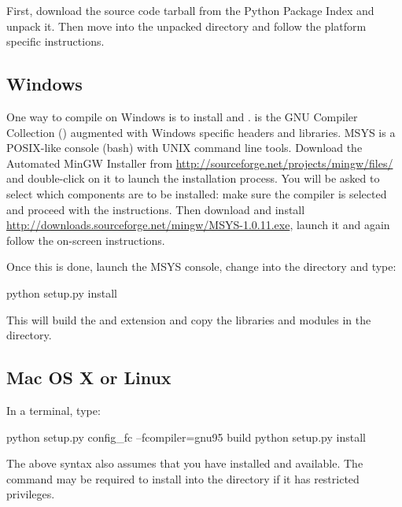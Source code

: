 \documentclass[]{jss}
\begin{document}
First, download the source code tarball from the Python Package Index and unpack it. Then move
into the unpacked directory and follow the platform specific instructions.



\subsection{Windows}
  \label{windows}%


One way to compile  on Windows is to install  \citep{mingw} and .  is
the GNU Compiler Collection () augmented with Windows specific headers and
libraries. MSYS is a POSIX-like console (bash) with UNIX command line tools.
Download the Automated MinGW Installer from \href{http://sourceforge.net/projects/mingw/files/}{http://sourceforge.net/projects/mingw/files/} and double-click on it to launch
the installation process. You will be asked to select which
components are to be installed: make sure the  \citep{gcc} compiler is selected and
proceed with the instructions. Then download and install \href{http://downloads.sourceforge.net/mingw/MSYS-1.0.11.exe}{http://downloads.sourceforge.net/mingw/MSYS-1.0.11.exe},
launch it and again follow the on-screen instructions.

Once this is done, launch the MSYS console, change into the  directory and
type:
\begin{CodeInput}
python setup.py install
\end{CodeInput}

This will build the  and  extension and copy the libraries and  
modules in the  directory.



\subsection{Mac OS X or Linux}
  \label{mac-os-x-or-linux}%


In a terminal, type:
\begin{CodeInput}
python setup.py config_fc --fcompiler=gnu95 build
python setup.py install
\end{CodeInput}

The above syntax also assumes that you have  installed and available. The
 command may be required to install  into the  
directory if it has restricted privileges.
\end{document}
